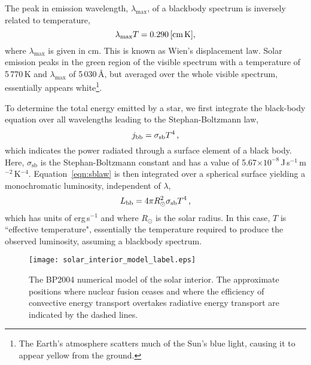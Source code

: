 The peak in emission wavelength, $\lambda_\mathrm{max}$, of a blackbody spectrum is inversely related to temperature,
\begin{equation}
\lambda_\mathrm{max} T =  0.290 \mbox{\,[cm\,K],}
\end{equation}
where $\lambda_\mathrm{max}$ is given in cm.
This is known as Wien's displacement law. Solar emission peaks in the green region of the visible spectrum with a temperature of 5\,770\,K and $\lambda_\mathrm{max}$ of 5\,030\,\AA, but averaged over the whole visible spectrum, essentially appears white\footnote{The Earth's atmosphere scatters much of the Sun's blue light, causing it to appear yellow from the ground.}.

To determine the total energy emitted by a star, we first integrate the black-body equation over all wavelengths leading to the Stephan-Boltzmann law,
\begin{equation}\label{eqn:sblaw}
j_{\mathrm{bb}}=\sigma_{\mathrm{sb}} T^4 \mbox{\,,}
\end{equation}
which indicates the power radiated through a surface element of a black body. Here, $\sigma_{\mathrm{sb}}$ is the Stephan-Boltzmann constant and has a value of 5.67$\times$$10^{-8}$\,J\,s$^{-1}$\,m$^{-2}$\,K$^{-4}$.
Equation~\ref{eqn:sblaw} is then integrated over a spherical surface yielding a monochromatic luminosity, independent of $\lambda$,
\begin{equation}\label{eqn:luminosity}
L_{\mathrm{bb}}=4\pi R_{\odot}^2 \sigma_{\mathrm{sb}} T^4 \mbox{\,,} 
\end{equation}
which has units of erg\,s$^{-1}$ and where $R_{\odot}$ is the solar radius. In this case, $T$ is ``effective temperature", essentially the temperature required to produce the observed luminosity, assuming a blackbody spectrum.

\begin{figure}[!t]
\centerline{\texttt{[image: solar\_interior\_model\_label.eps]}}
\caption[The BP2004 numerical model of the solar interior.]{The BP2004 numerical model \citep{Bahcall:2004} of the solar interior. The approximate positions where nuclear fusion ceases and where the efficiency of convective energy transport overtakes radiative energy transport are indicated by the dashed lines.}
\label{fig:tinteriormodel}
\end{figure}

